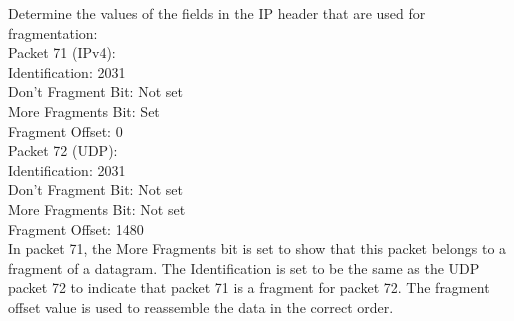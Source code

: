 Determine the values of the fields in the IP header that are used for fragmentation: \\

Packet 71 (IPv4): \\
Identification: 2031\\
Don't Fragment Bit: Not set\\
More Fragments Bit: Set\\
Fragment Offset: 0\\

Packet 72 (UDP): \\
Identification: 2031\\
Don't Fragment Bit: Not set\\
More Fragments Bit: Not set\\
Fragment Offset: 1480\\

In packet 71, the More Fragments bit is set to show that this packet belongs to a fragment of a datagram. The Identification is set to be the same as the UDP packet 72 to indicate that packet 71 is a fragment for packet 72. The fragment offset value is used to reassemble the data in the correct order. \\
